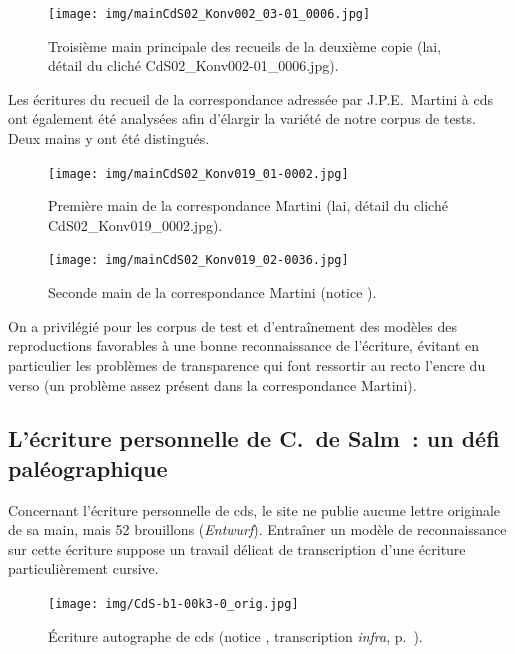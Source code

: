 \documentclass[a4paper,12pt,twoside]{book}
\begin{document}
				\begin{figure}[!h]
					\centering
					\texttt{[image: img/mainCdS02\_Konv002\_03-01\_0006.jpg]}
					\caption{Troisième main principale des recueils de la deuxième copie  (\gls{lai}, détail du cliché CdS02\_Konv002-01\_0006.jpg).}
					\label{}
				\end{figure}
					
				Les écritures du recueil de la correspondance adressée par J.P.E.~Martini à \gls{cds} ont également été analysées afin d'élargir la variété de notre corpus de tests. Deux mains y ont été distingués.
				
				\begin{figure}[!h]
					\centering
					\texttt{[image: img/mainCdS02\_Konv019\_01-0002.jpg]}
					\caption{Première main de la correspondance Martini (\gls{lai}, détail du cliché CdS02\_Konv019\_0002.jpg).}
					\label{}
				\end{figure}
				
				\begin{figure}[!h]
					\centering
					\texttt{[image: img/mainCdS02\_Konv019\_02-0036.jpg]}
					\caption{Seconde main de la correspondance Martini (notice \cite{CdS19036037}).}
					\label{}
				\end{figure}
					
				On a privilégié pour les corpus de test et d'entraînement des modèles des reproductions favorables à une bonne reconnaissance de l'écriture, évitant en particulier les problèmes de transparence qui font ressortir au recto l'encre du verso (un problème assez présent dans la correspondance Martini).

			\subsection{L'écriture personnelle de C.~de Salm~: un défi paléographique}
				Concernant l'écriture personnelle de \gls{cds}, le site ne publie aucune lettre originale de sa main, mais 52 brouillons (\textit{Entwurf}). Entraîner un modèle de reconnaissance sur cette écriture suppose un travail délicat de transcription d'une écriture particulièrement cursive.
				
				\begin{figure}[!h]
					\centering
					\texttt{[image: img/CdS-b1-00k3-0\_orig.jpg]}
					\caption{Écriture autographe de \gls{cds} (notice \cite{C11S92047049}, transcription \textit{infra}, p.~\pageref{trans-C11S92047049}).}
					\label{}
				\end{figure}
				
\end{document}
